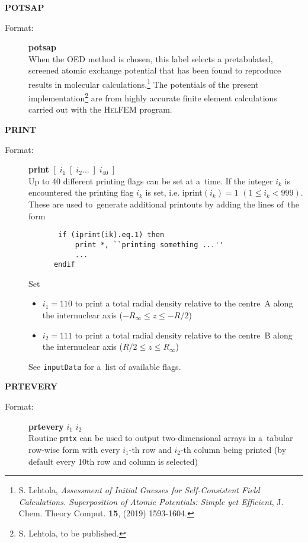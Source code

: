 \documentclass[10pt,a4paper]{article}
\newcommand{\ft}[1]{\texttt{#1}}
\begin{document}
\begin{description}
\item \textbf{POTSAP}
\begin{description}
\item[Format:] \textbf{potsap} \\ When the OED method is chosen, this
  label selects a pretabulated, screened atomic exchange potential
  that has been found to reproduce results in molecular
  calculations.\footnote{S. Lehtola, \textsl{Assessment of Initial
      Guesses for Self-Consistent Field Calculations. Superposition of
      Atomic Potentials: Simple yet Efficient}, J. Chem. Theory
    Comput. \textbf{15}, (2019)
    1593-1604. } The potentials of the
  present implementation\footnote{S. Lehtola, to be published.} are
  from highly accurate finite element calculations carried out with
  the \textsc{HelFEM} program.
\end{description}

\item \textbf{PRINT}
\begin{description}
\item[Format:] \textbf{print} $[\; i_1 \; [\;i_2 \ldots \;] \;i_{40}\;]$ \\ Up to 40
  different printing flags can be set at a~time. If the integer $i_k$ is encountered the
  printing flag $i_k$ is set, i.e. iprint$(i_k)=1$ $(1 \leq i_k<999)$. These are used
  to~generate additional printouts by adding the lines of~the form
  \begin{verbatim}
       if (iprint(ik).eq.1) then
           print *, ``printing something ...''
           ...
      endif
    \end{verbatim}

Set
\begin{itemize}
\item $i_1=110$ to print a total radial density relative to the
  centre~A along the internuclear axis ($-R_{\infty}\le z\le -R/2$)

\item $i_2=111$ to print a total radial density relative to the
  centre~B along the internuclear axis ($R/2\le z\le R_{\infty}$)
\end{itemize}
See \ft{inputData} for a~list of available flags.

\end{description}


\item \textbf{PRTEVERY}
\begin{description}
\item[Format:] \textbf{prtevery} $i_1$ $i_2$ \\ Routine \ft{pmtx} can be used to output
  two-dimensional arrays in a~tabular row-wise form with every $i_1$-th row and $i_2$-th
  column being printed (by default every 10th row and column is selected)
\end{description}



\end{description}
\end{document}
